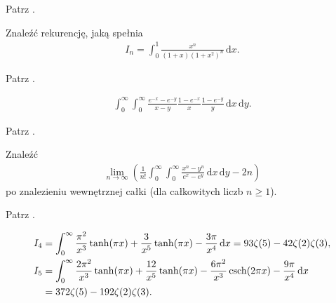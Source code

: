
\begin{solution}
    Patrz \cite[s. 17]{valean19}.
\end{solution}

\begin{problem_with_solution}
    \label{valean_1_32}%
    Znaleźć rekurencję, jaką spełnia
    \begin{align}
        I_n = \int_0^1 \frac{x^n}{(1+x)(1+x^2)^n} \,\mathrm{d}x.
    \end{align} 
\end{problem_with_solution}


\begin{solution}
    Patrz \cite[s. 21, 22]{valean19}.
\end{solution}

\begin{problem_with_solution}
    \label{valean_1_37}%
    \begin{align}
        \int_0^\infty \int_0^\infty \frac {e^{-x}-e^{-y}}{x-y} \frac{1-e^{-x}}{x} \frac{1-e^{-y}}{y} \,\mathrm{d}x \,\mathrm{d}y.
    \end{align} 
\end{problem_with_solution}

\begin{solution}
    Patrz \cite[s. ?????]{valean19}.
\end{solution}


\begin{problem_with_solution}
    \label{valean_1_38}%
    Znaleźć
    \begin{align}
        \lim_{n\to\infty} \left(\frac{1}{n!} \int_0^\infty \int_0^\infty \frac{x^n - y^n}{e^x - e^y} \,\mathrm{d}x \,\mathrm{d}y - 2n\right)
    \end{align} 
    po znalezieniu wewnętrznej całki (dla całkowitych liczb $n \ge 1$).
\end{problem_with_solution}

\begin{solution}
    Patrz \cite[s. ?????]{valean19}.
\end{solution}

\begin{problem_with_solution}
    \label{valean_1_40}%
    \begin{align}
        I_4 & = \int_0^\infty \frac{\pi^2}{x^3} \tanh (\pi x)  + \frac{3}{x^5} \tanh(\pi x) - \frac{3\pi}{x^4} \,\mathrm{d}x = 93 \zeta(5) - 42 \zeta(2) \zeta(3), \\
        I_5 & = \int_0^\infty \frac{2\pi^2}{x^3} \tanh(\pi x) + \frac{12}{x^5} \tanh (\pi x) - \frac{6 \pi^2}{x^3} \operatorname{csch} (2 \pi x) - \frac{9 \pi}{x^4} \,\mathrm{d} x \\
        & = 372 \zeta(5) - 192 \zeta(2)\zeta(3).
    \end{align} 
\end{problem_with_solution}

